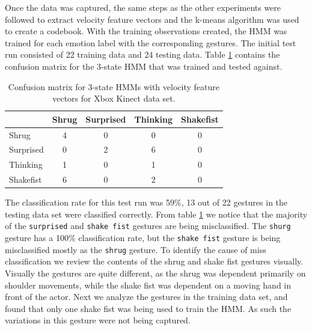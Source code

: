 \documentclass[]{report}   %
\begin{document}
Once the data was captured, the same steps as the other experiments were followed to extract velocity feature vectors and the k-means algorithm was used to create a codebook. With the training observations created, the HMM was trained for each emotion label with the corresponding gestures. The initial test run consisted of 22 training data and 24 testing data. Table \ref{tab:xboxdim3state1} contains the confusion matrix for the 3-state HMM that was trained and tested against. 
\begin{table}[htbp]
	\centering
		\begin{tabular}{|l|c|c|c|c|}
		\hline
             & Shrug & Surprised & Thinking & Shakefist \\ \hline
        Shrug 		& 4     & 0    & 0     & 0   \\ \hline
        Surprised 	& 0     & 2    & 6     & 0   \\ \hline
        Thinking 	& 1     & 0    & 1     & 0  \\ \hline
        Shakefist   & 6     & 0    & 2     & 0  \\
		\hline
		\end{tabular}
	\caption{Confusion matrix for 3-state HMMs with velocity feature vectors for Xbox Kinect data set.}
	\label{tab:xboxdim3state1}
\end{table}
The classification rate for this test run was 59\%, 13 out of 22 gestures in the testing data set were classified correctly. From table \ref{tab:xboxdim3state1} we notice that the majority of the \texttt{surprised} and \texttt{shake fist} gestures are being misclassified. The \texttt{shurg} gesture has a 100\% classification rate, but the \texttt{shake fist} gesture is being misclassified mostly as the \texttt{shrug} gesture. To identify the cause of miss classification we review the contents of the shrug and shake fist gestures visually. Visually the gestures are quite different, as the shrug was dependent primarily on shoulder movements, while the shake fist was dependent on a moving hand in front of the actor. Next we analyze the gestures in the training data set, and found that only one shake fist was being used to train the HMM. As such the variations in this gesture were not being captured.
\end{document}
